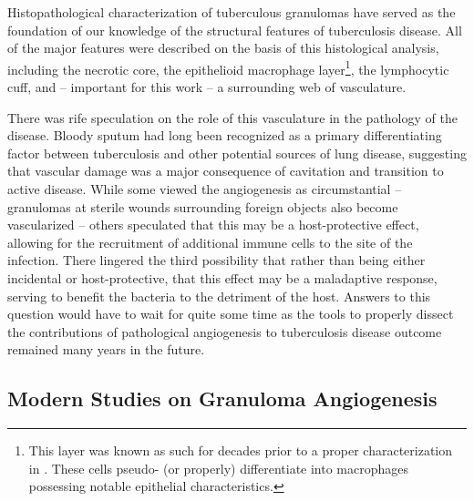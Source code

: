Histopathological characterization of tuberculous granulomas have served as the foundation of our knowledge of the structural features of tuberculosis disease. All of the major features were described on the basis of this histological analysis, including the necrotic core, the epithelioid macrophage layer\footnote{This layer was known as such for decades prior to a proper characterization in \citet{Cronan2016}. These cells pseudo\hyp{} (or properly) differentiate into macrophages possessing notable epithelial characteristics.}, the lymphocytic cuff, and -- important for this work -- a surrounding web of vasculature. 

There was rife speculation on the role of this vasculature in the pathology of the disease. Bloody sputum had long been recognized as a primary differentiating factor between tuberculosis and other potential sources of lung disease, suggesting that vascular damage was a major consequence of cavitation and transition to active disease. While some viewed the angiogenesis as circumstantial -- granulomas at sterile wounds surrounding foreign objects also become vascularized -- others speculated that this may be a host\hyp{}protective effect, allowing for the recruitment of additional immune cells to the site of the infection. There lingered the third possibility that rather than being either incidental or host\hyp{}protective, that this effect may be a maladaptive response, serving to benefit the bacteria to the detriment of the host. Answers to this question would have to wait for quite some time as the tools to properly dissect the contributions of pathological angiogenesis to tuberculosis disease outcome remained many years in the future.

\subsection{Modern Studies on Granuloma Angiogenesis}\label{granang}

